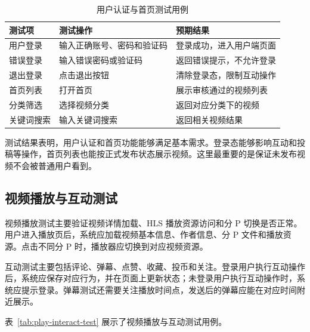\begin{table}[htbp]
  \centering
  \caption{用户认证与首页测试用例}
  \label{tab:user-auth-home-test}
  \begin{tabular}{p{}p{}p{}}
    \hline
    \textbf{测试项} & \textbf{测试操作} & \textbf{预期结果} \\
    \hline
    用户登录 & 输入正确账号、密码和验证码 & 登录成功，进入用户端页面 \\
    错误登录 & 输入错误密码或验证码 & 返回错误提示，不允许登录 \\
    退出登录 & 点击退出按钮 & 清除登录态，限制互动操作 \\
    首页列表 & 打开首页 & 展示审核通过的视频列表 \\
    分类筛选 & 选择视频分类 & 返回对应分类下的视频 \\
    关键词搜索 & 输入关键词搜索 & 返回相关视频结果 \\
    \hline
  \end{tabular}
\end{table}

测试结果表明，用户认证和首页功能能够满足基本需求。登录态能够影响互动和投稿等操作，首页列表也能按正式发布状态展示视频。这里最重要的是保证未发布视频不会被普通用户看到。

\subsection{视频播放与互动测试}
\label{subsec:video-play-interact-test}

视频播放测试主要验证视频详情加载、HLS 播放资源访问和分 P 切换是否正常。用户进入播放页后，系统应加载视频基本信息、作者信息、分 P 文件和播放资源。点击不同分 P 时，播放器应切换到对应视频资源。

互动测试主要包括评论、弹幕、点赞、收藏、投币和关注。登录用户执行互动操作后，系统应保存对应行为，并在页面上更新状态；未登录用户执行互动操作时，系统应提示登录。弹幕测试还需要关注播放时间点，发送后的弹幕应能在对应时间附近展示。

表~\ref{tab:play-interact-test} 展示了视频播放与互动测试用例。

